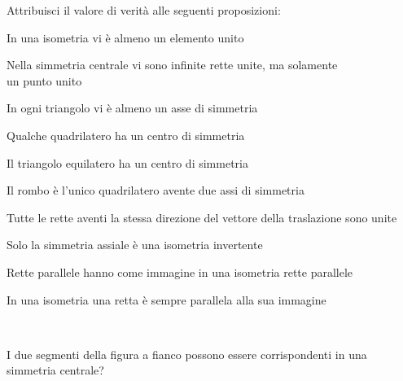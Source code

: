 \begin{esercizio}
\label{ese:8.90} %
Attribuisci il valore di verità alle seguenti proposizioni:
\begin{enumeratea}
\item In una isometria vi è almeno un elemento 
unito\hfill\boxV\quad\boxF
\item Nella simmetria centrale vi sono infinite rette unite, ma 
solamente \\
un punto unito\hfill\boxV\quad\boxF
\item In ogni triangolo vi è almeno un asse di 
simmetria\hfill\boxV\quad\boxF
\item Qualche quadrilatero ha un centro di 
simmetria\hfill\boxV\quad\boxF
\item Il triangolo equilatero ha un centro di 
simmetria\hfill\boxV\quad\boxF
\item Il rombo è l'unico quadrilatero avente due assi di 
simmetria\hfill\boxV\quad\boxF
\item Tutte le rette aventi la stessa direzione del vettore della 
traslazione sono unite\hfill\boxV\quad\boxF
\item Solo la simmetria assiale è una isometria 
invertente\hfill\boxV\quad\boxF
\item Rette parallele hanno come immagine in una isometria rette 
parallele\hfill\boxV\quad\boxF
\item In una isometria una retta è sempre parallela alla sua 
immagine\hfill\boxV\quad\boxF
\end{enumeratea}
\end{esercizio}


\begin{esercizio}
\label{ese:}
~

\noindent\begin{minipage}{.70\textwidth}
I due segmenti della figura a fianco possono essere corrispondenti in 
una simmetria centrale?
\end{minipage} 
\begin{minipage}{.28\textwidth}
\begin{inaccessibleblock}
\begin{center}  \end{center}
\end{inaccessibleblock}
\end{minipage}
\end{esercizio}

% 

